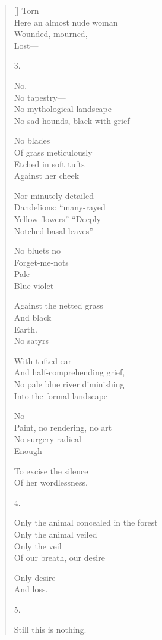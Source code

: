 \begin{verse}[\versewidth]
Torn\\
Here an almost nude woman\\
Wounded, mourned, \\
Lost---

3.

No.\\
No tapestry---\\
No mythological landscape---\\
No sad hounds, black with grief---

No blades\\
Of grass meticulously\\
Etched in soft tufts \\
Against her cheek

Nor minutely detailed\\
Dandelions: ``many-rayed\\
Yellow flowers'' ``Deeply\\
Notched basal leaves''

No bluets   no\\
Forget-me-nots\\
Pale\\
Blue-violet

Against the netted grass\\
And black\\
Earth.\\
No satyrs

With tufted ear\\
And half-comprehending grief,\\
No pale blue river diminishing\\
Into the formal landscape---

No\\
Paint, no rendering, no art\\
No surgery radical\\
Enough

To excise the silence\\
Of her wordlessness.

4.

Only the animal concealed in the forest\\
Only the animal veiled\\
Only the veil\\
Of our breath, our desire

Only desire\\
And loss.

5.

Still this is nothing. 
\end{verse}
